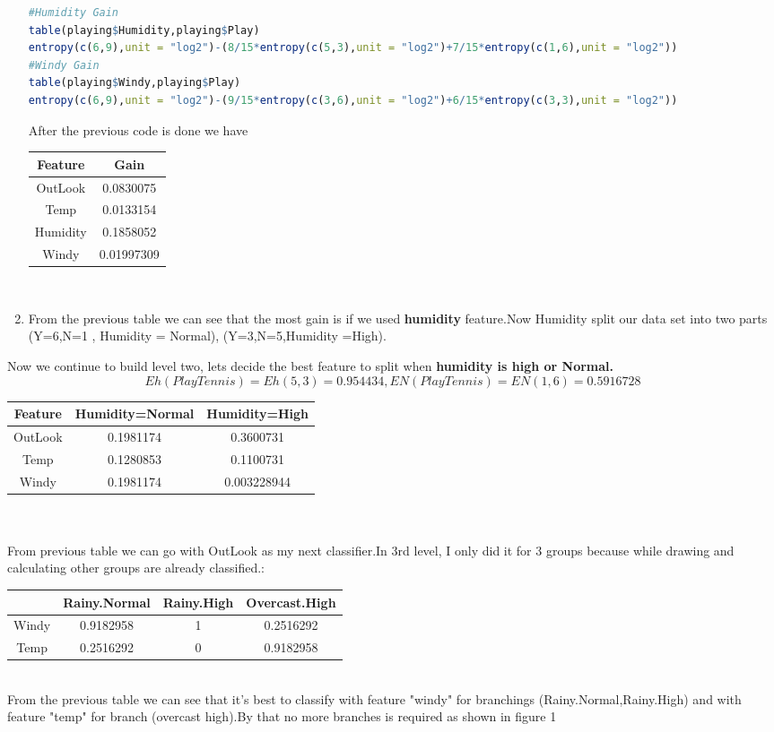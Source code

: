 \documentclass{article}
\begin{document}
\begin{enumerate}
\begin{lstlisting}[language=R]
#Humidity Gain
table(playing$Humidity,playing$Play)
entropy(c(6,9),unit = "log2")-(8/15*entropy(c(5,3),unit = "log2")+7/15*entropy(c(1,6),unit = "log2"))
#Windy Gain
table(playing$Windy,playing$Play)
entropy(c(6,9),unit = "log2")-(9/15*entropy(c(3,6),unit = "log2")+6/15*entropy(c(3,3),unit = "log2"))
\end{lstlisting}
After the previous code is done we have \\
\begin{tabular}{|c|c|} 
\hline
Feature&Gain\\	\hline
OutLook&0.0830075\\	\hline
Temp&0.0133154\\	\hline
Humidity&0.1858052\\	\hline
Windy&0.01997309\\	\hline
\end{tabular}\\
\item From the previous table we can see that the most gain is if we used \textbf{humidity} feature.Now Humidity split our data set into two parts 
(Y=6,N=1 , Humidity = Normal), (Y=3,N=5,Humidity =High).\\
\end{enumerate}
Now we continue to build level two, lets decide the best feature to split when \textbf{humidity is high or Normal.}
\[Eh(PlayTennis)= Eh(5,3)=0.954434,EN(PlayTennis)= EN(1,6)=0.5916728\]
\begin{tabular}{|c|c|c|} 
	\hline
Feature&Humidity=Normal&Humidity=High\\ \hline
OutLook&0.1981174&0.3600731\\	\hline
Temp&0.1280853&0.1100731\\	\hline
Windy&0.1981174&0.003228944\\	\hline
\end{tabular}\\ \\
From previous table we can go with OutLook as my next classifier.In 3rd level, I only did it for 3 groups because while drawing and calculating other groups are already classified.:\\
\begin{tabular}{|c|c|c|c|}
	\hline
&Rainy.Normal&Rainy.High&Overcast.High\\ \hline
Windy&0.9182958&1&0.2516292\\
\hline
Temp&0.2516292&0&0.9182958\\
\hline
\end{tabular}\\
From the previous table we can see that it's best to classify with feature "windy" for branchings (Rainy.Normal,Rainy.High) and with feature "temp" for branch (overcast high).By that no more branches is required as shown in figure 1
\end{document}
